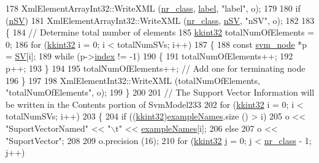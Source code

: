 \begin{DoxyCode}
178     XmlElementArrayInt32::WriteXML (\hyperlink{struct_s_v_m233_1_1_svm_model233_a55a9d2b4d87f50f14dfdcc1afc65b47b}{nr\_class}, \hyperlink{struct_s_v_m233_1_1_svm_model233_a36d0c9e4a7019a0de64fc8661cc10bf3}{label}, \textcolor{stringliteral}{"label"}, o);
179 
180   \textcolor{keywordflow}{if}  (\hyperlink{struct_s_v_m233_1_1_svm_model233_a4f2e1cae54d713246c1c7b63a5b30136}{nSV})
181     XmlElementArrayInt32::WriteXML (\hyperlink{struct_s_v_m233_1_1_svm_model233_a55a9d2b4d87f50f14dfdcc1afc65b47b}{nr\_class}, \hyperlink{struct_s_v_m233_1_1_svm_model233_a4f2e1cae54d713246c1c7b63a5b30136}{nSV}, \textcolor{stringliteral}{"nSV"}, o);
182 
183   \{
184     \textcolor{comment}{// Determine total number of elements}
185     \hyperlink{namespace_k_k_b_a8fa4952cc84fda1de4bec1fbdd8d5b1b}{kkint32}  totalNumOfElements = 0;
186     \textcolor{keywordflow}{for}  (\hyperlink{namespace_k_k_b_a8fa4952cc84fda1de4bec1fbdd8d5b1b}{kkint32} i = 0;  i < totalNumSVs;  i++)
187     \{
188       \textcolor{keyword}{const} \hyperlink{struct_s_v_m233_1_1svm__node}{svm\_node} *p = \hyperlink{struct_s_v_m233_1_1_svm_model233_a97dd1118f0bf7803ad6f4d952a56d06b}{SV}[i];
189       \textcolor{keywordflow}{while}  (p->\hyperlink{struct_s_v_m233_1_1svm__node_a3c4e097d4f2ba8091128a9b605fcaa12}{index} != -1)
190       \{
191         totalNumOfElements++;
192         p++;
193       \}
194 
195       totalNumOfElements++;  \textcolor{comment}{// Add one for terminating node}
196     \}
197 
198     XmlElementInt32::WriteXML (totalNumOfElements, \textcolor{stringliteral}{"totalNumOfElements"}, o);
199   \}
200 
201   \textcolor{comment}{// The Support Vector Information will be written in the Contents portion of SvmModel233}
202   \textcolor{keywordflow}{for}  (\hyperlink{namespace_k_k_b_a8fa4952cc84fda1de4bec1fbdd8d5b1b}{kkint32} i = 0;  i < totalNumSVs;  i++)
203   \{
204     \textcolor{keywordflow}{if}  ((\hyperlink{namespace_k_k_b_a8fa4952cc84fda1de4bec1fbdd8d5b1b}{kkint32})\hyperlink{struct_s_v_m233_1_1_svm_model233_afa332c55cdafdab8746f38c85fb22741}{exampleNames}.size () > i)
205       o << \textcolor{stringliteral}{"SuportVectorNamed"}  << \textcolor{stringliteral}{"\(\backslash\)t"} << \hyperlink{struct_s_v_m233_1_1_svm_model233_afa332c55cdafdab8746f38c85fb22741}{exampleNames}[i];
206     \textcolor{keywordflow}{else}
207       o << \textcolor{stringliteral}{"SuportVector"};
208 
209     o.precision (16);
210     \textcolor{keywordflow}{for} (\hyperlink{namespace_k_k_b_a8fa4952cc84fda1de4bec1fbdd8d5b1b}{kkint32} j = 0;  j < \hyperlink{struct_s_v_m233_1_1_svm_model233_a55a9d2b4d87f50f14dfdcc1afc65b47b}{nr\_class} - 1;  j++)

\end{DoxyCode}

